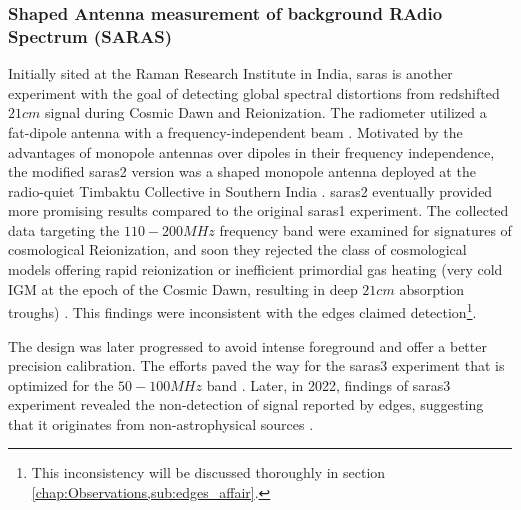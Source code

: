 \documentclass[12pt, TexShade, letterpaper]{report}
\begin{document}
\subsubsection{Shaped Antenna measurement of background RAdio Spectrum (SARAS)} 
Initially sited at the Raman Research Institute in India, \gls{saras} is another experiment with the goal of detecting global spectral distortions from redshifted $21cm$ signal during Cosmic Dawn and Reionization. The radiometer utilized a fat-dipole antenna with a frequency-independent beam \cite{saras_1}. Motivated by the advantages of monopole antennas over dipoles in their frequency independence, the modified \gls{saras}2 version was a shaped monopole antenna deployed at the radio-quiet Timbaktu Collective in Southern India \cite{saras_2}. \gls{saras}2 eventually provided more promising results compared to the original \gls{saras}1 experiment. The collected data targeting the $110-200 MHz$ frequency band were examined for signatures of cosmological Reionization, and soon they rejected the class of cosmological models offering rapid reionization or inefficient primordial gas heating (very cold IGM at the epoch of the Cosmic Dawn, resulting in deep $21cm$ absorption troughs) \cite{saras_2_constrains, saras_2_results}. This findings were inconsistent with the \gls{edges} claimed detection\footnote{This inconsistency will be discussed thoroughly in section \ref{chap:Observations,sub:edges_affair}.}\cite{dark_ages_space, thesis_shedding, saras_curse_edges}.\par
The design was later progressed to avoid intense foreground and offer a better precision calibration. The efforts paved the way for the \gls{saras}3 experiment that is optimized for the $50-100 MHz$ band \cite{saras_3, dark_ages_space}. Later, in 2022, findings of \gls{saras}3 experiment revealed the non-detection of signal reported by \gls{edges}, suggesting that it originates from non-astrophysical sources \cite{saras_3_results}.\par
\end{document}
